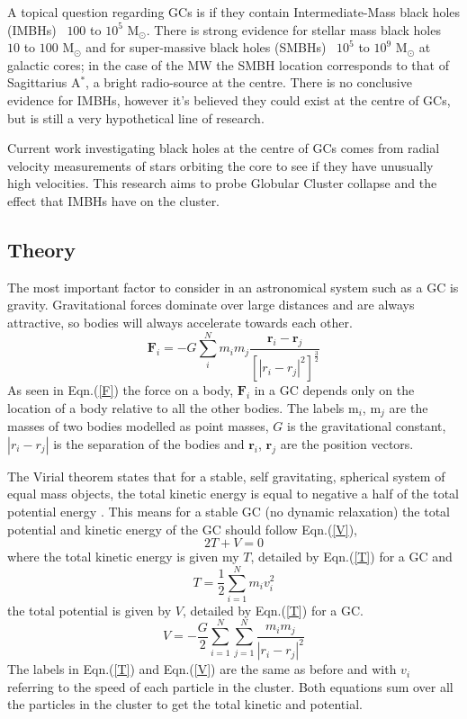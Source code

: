 \documentclass{article}
\begin{document}
\begin{multicols}{2}
A topical question regarding GCs is if they contain Intermediate-Mass black holes (IMBHs) ~$100$ to $10^5$ M$_{\odot}$. There is strong evidence for stellar mass black holes ~$10$ to $100$ M$_{\odot}$ and for super-massive black holes (SMBHs) ~$10^5$ to $10^9$ M$_{\odot}$ at galactic cores; in the case of the MW the SMBH location corresponds to that of Sagittarius A$^*$, a bright radio-source at the centre. There is no conclusive evidence for IMBHs, however it’s believed they could exist at the centre of GCs, but is still a very hypothetical line of research. 

Current work investigating black holes at the centre of GCs comes from radial velocity measurements of stars orbiting the core to see if they have unusually high velocities. This research aims to probe Globular Cluster collapse and the effect that IMBHs have on the cluster.


\subsection{Theory}
The most important factor to consider in an astronomical system such as a GC is gravity. Gravitational forces dominate over large distances and are always attractive, so bodies will always accelerate towards each other. 
\begin{equation}
    \textbf{F}_{i} = -G \sum_i^N m_i m_j \frac{\textbf{r}_i - \textbf{r}_j} {[|r_i-r_j|^2]^\frac{3}{2}}
    \label{F}
\end{equation}
As seen in Eqn.(\ref{F}) the force on a body, $\textbf{F}_{i}$ in a GC depends only on the location of a body relative to all the other bodies. The labels m$_i$, m$_j$ are the masses of two bodies modelled as point masses, $G$ is the gravitational constant, $|r_i - r_j|$ is the separation of the bodies and $\textbf{r}_i$, $\textbf{r}_j$ are the position vectors.

The Virial theorem states that for a stable, self gravitating, spherical system of equal mass objects, the total kinetic energy is equal to negative a half of the total potential energy \cite{Virialreference}. This means for a stable GC (no dynamic relaxation) the total potential and kinetic energy of the GC should follow Eqn.(\ref{V}),
\begin{equation}
    2T + V = 0  
    \label{Virial}
\end{equation}
where the total kinetic energy is given my $T$, detailed by  Eqn.(\ref{T}) for a GC and 
\begin{equation}
    T = \frac{1}{2} \sum_{i=1}^{N} m_i v_i^2  
    \label{T}
\end{equation}
the total potential is given by $V$, detailed by  Eqn.(\ref{T}) for a GC.
\begin{equation}
     V = -\frac{G}{2} \sum_{i=1}^{N} \sum_{j=1}^{N}\frac{m_i m_j}{|r_i-r_j|^2}   
    \label{V}
\end{equation}
The labels in Eqn.(\ref{T}) and Eqn.(\ref{V}) are the same as before and with $v_i$ referring to the speed of each particle in the cluster. Both equations sum over all the particles in the cluster to get the total kinetic and potential.


\end{multicols}
\end{document}
